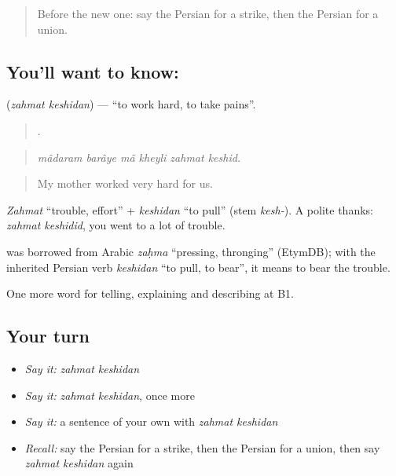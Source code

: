 \label{lesson:FA-C384-zahmat-keshidan}



\begin{quote}
Before the new one: say the Persian for a strike, then the Persian for a union.
\end{quote}

\subsection*{You'll want to know:  }
\textbf{ } (\emph{zahmat keshidan}) — \textquotedblleft{}to work hard, to take pains\textquotedblright{}.

\begin{quote}
     .
\end{quote}

\begin{quote}
\emph{mâdaram barâye mâ kheyli zahmat keshid.}
\end{quote}

\begin{quote}
My mother worked very hard for us.
\end{quote}

\emph{Zahmat} \textquotedblleft{}trouble, effort\textquotedblright{} + \emph{keshidan} \textquotedblleft{}to pull\textquotedblright{} (stem \emph{kesh-}). A polite thanks: \emph{zahmat keshidid}, you went to a lot of trouble.

\begin{cousinweb}
\textbf{} was borrowed from Arabic \emph{zaḥma} \textquotedblleft{}pressing, thronging\textquotedblright{} (EtymDB); with the inherited Persian verb \emph{keshidan} \textquotedblleft{}to pull, to bear\textquotedblright{}, it means to bear the trouble.
\end{cousinweb}

\begin{grammarlens}[title={What you've built}]
One more word for telling, explaining and describing at B1.
\end{grammarlens}

\subsection*{Your turn}
\begin{itemize}
\raggedright
  \item \emph{Say it:} \emph{zahmat keshidan}
  \item \emph{Say it:} \emph{zahmat keshidan}, once more
  \item \emph{Say it:} a sentence of your own with \emph{zahmat keshidan}
  \item \emph{Recall:} say the Persian for a strike, then the Persian for a union, then say \emph{zahmat keshidan} again
\end{itemize}

